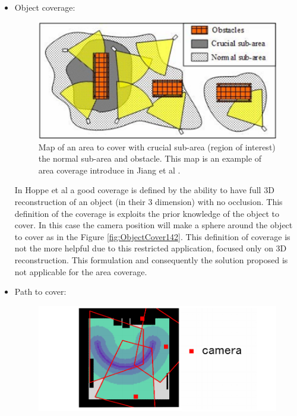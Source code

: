\begin{itemize}
\item Object coverage: \\
\begin{figure}[t!]
\center
{}
   \includegraphics[width=\linewidth]{img/MapRoI165.png}
  \caption{ Map of an area to cover with crucial sub-area (region of interest) the normal sub-area  and obstacle. This map is an example of area coverage  introduce in  Jiang et al \cite{165*jiang2010}. }\label{fig:MapRoI165}
  \endminipage\hfill
\end{figure}
   In Hoppe et al \cite{142*hoppe2012} a good coverage is defined by the ability to have full 3D reconstruction of an object (in their 3 dimension) with no occlusion. This definition of the coverage is exploits the prior knowledge of the object to cover. In this case the camera position will make a sphere around the object to cover as in the Figure \ref{fig:ObjectCover142}. 
   This definition of coverage is not the more helpful due to this restricted application, focused only on 3D reconstruction. This formulation and consequently the solution proposed is not applicable for the area coverage.\\ 
   \item Path to cover: \\
   \begin{figure}[t!]
\center
{}
   \includegraphics[width=\linewidth]{img/PathToCover[81].png}

\end{figure}
\end{itemize}
